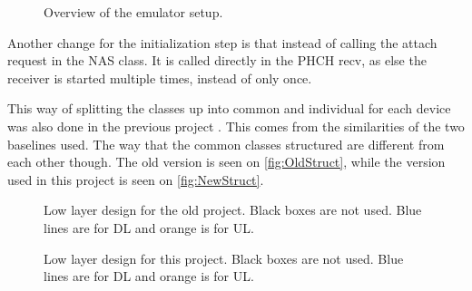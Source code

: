 \begin{figure}[H]


\centering

\resizebox{0.5\textwidth}{!}{

}

\caption{Overview of the emulator setup.}

\label{fig:InitNew}

\end{figure}

Another change for the initialization step is that instead of calling the attach request in the NAS class. It is called directly in the PHCH recv, as else the receiver is started multiple times, instead of only once.

This way of splitting the classes up into common and individual for each device was also done in the previous project \citep{thesis_report}. This comes from the similarities of the two baselines used. The way that the common classes structured are different from each other though. The old version is seen on \autoref{fig:OldStruct}, while the version used in this project is seen on \autoref{fig:NewStruct}.

\begin{figure}[H]


\centering

\resizebox{0.5\textwidth}{!}{

}

\caption{Low layer design for the old project. Black boxes are not used. Blue lines are for DL and orange is for UL.}

\label{fig:OldStruct}

\end{figure}

\begin{figure}[H]


\centering

\resizebox{0.5\textwidth}{!}{

}

\caption{Low layer design for this project. Black boxes are not used. Blue lines are for DL and orange is for UL.}

\label{fig:NewStruct}

\end{figure}

